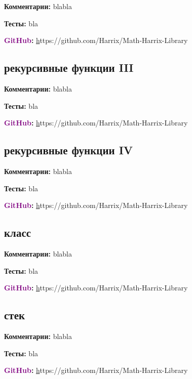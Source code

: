 \documentclass[a4paper,,titlepage]{report}
\newcommand{\gitlink}[1]{\textsf{\textbf {\textcolor{purple}{GitHub}:  }}\selectfont \href{}#1\par}
\newcommand{\comments}[1]{\textsf{\textbf {Комментарии:  }}#1\par}
\newcommand{\tests}[1]{\textsf{\textbf {Тесты:  }}#1\par}
\begin{document}
 \begin{flushleft}
\comments{bla\newline bla}
\tests{bla} 
\gitlink{https://github.com/Harrix/Math-Harrix-Library}
\end{flushleft}


\begin{center}\section{рекурсивные функции III}\end{center}
 
 \begin{flushleft}
\comments{bla\newline bla}
\tests{bla} 
\gitlink{https://github.com/Harrix/Math-Harrix-Library}
\end{flushleft}


\begin{center}\section{рекурсивные функции IV}\end{center}
 
 \begin{flushleft}
\comments{bla\newline bla}
\tests{bla} 
\gitlink{https://github.com/Harrix/Math-Harrix-Library}
\end{flushleft}


\begin{center}\section{класс}\end{center}
 
 \begin{flushleft}
\comments{bla\newline bla}
\tests{bla} 
\gitlink{https://github.com/Harrix/Math-Harrix-Library}
\end{flushleft}


\begin{center}\section{стек}\end{center}
 
 \begin{flushleft}
\comments{bla\newline bla}
\tests{bla} 

\gitlink{https://github.com/Harrix/Math-Harrix-Library}
\end{flushleft}
\end{document}
